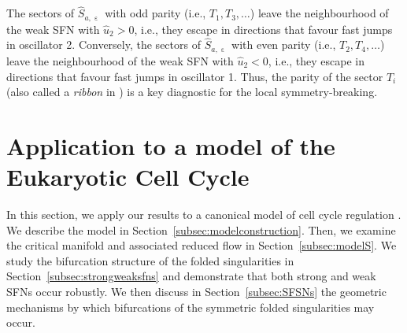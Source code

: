 \documentclass[10pt,onecolumn]{article}
\theoremstyle{plain}
\DeclareMathOperator{\eps}{\varepsilon}
\begin{document}
The sectors of $\widehat{S}_{a,\eps}$ with odd parity (i.e., $T_1,T_3,\ldots$) leave the neighbourhood of the weak SFN with $\hat u_2 >0$, i.e., they escape in directions that favour fast jumps in oscillator 2. Conversely, the sectors of $\widehat{S}_{a,\eps}$ with even parity (i.e., $T_{2}, T_4, \ldots$) leave the neighbourhood of the weak SFN with $\hat u_2 <0$, i.e., they escape in directions that favour fast jumps in oscillator 1. 
Thus, the parity of the sector $T_i$ (also called a {\em ribbon} in \cite{Hasan2017}) is a key diagnostic for the local symmetry-breaking. 


\section{Application to a model of the Eukaryotic Cell Cycle} \label{sec:modelgspt}
In this section, we apply our results to a canonical model of cell cycle regulation \cite{Dragoi2024}.
We describe the model in Section~\ref{subsec:modelconstruction}.  
Then, we examine the critical manifold and associated reduced flow in Section~\ref{subsec:modelS}. 
We study the bifurcation structure of the folded singularities in Section~\ref{subsec:strongweaksfns} and demonstrate that both strong and weak SFNs occur robustly.
We then discuss in Section~\ref{subsec:SFSNs} the geometric mechanisms by which bifurcations of the symmetric folded singularities may occur. 


\end{document}

